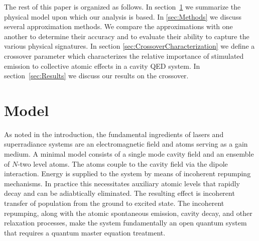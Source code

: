 \documentclass[aps,
twocolumn,
showpacs,
superscriptaddress,groupedaddress]{revtex4}
\begin{document}
The rest of this paper is organized as follows.  In
section~\ref{sec:Model} we summarize the physical model upon which our
analysis is based. In \ref{sec:Methods} we discuss several approximation
methods.  We compare the approximations with one another to determine
their accuracy and to evaluate their ability to capture the various
physical signatures. In section \ref{sec:CrossoverCharacterization} we
define a crossover parameter which characterizes the relative importance
of stimulated emission to collective atomic effects in a cavity QED
system.  In section~\ref{sec:Results} we discuss our results on the
crossover.


\section{Model}
\label{sec:Model}

As noted in the introduction, the fundamental ingredients of lasers
and superradiance systems are an electromagnetic field and atoms
serving as a gain medium.  A minimal model consists of a single mode
cavity field and an ensemble of $N$-two level atoms.  The atoms couple
to the cavity field via the dipole interaction.  Energy is supplied to
the system by means of incoherent repumping mechanisms.  In practice
this necessitates auxiliary atomic levels that rapidly decay and can
be adiabtically eliminated. The resulting effect is incoherent
transfer of population from the ground to excited state. The
incoherent repumping, along with the atomic spontaneous emission,
cavity decay, and other relaxation processes, make the system
fundamentally an open quantum system that requires a quantum master
equation treatment.
\end{document}
